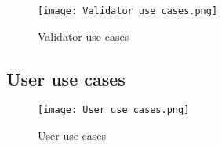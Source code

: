\begin{figure}[H]
    \texttt{[image: Validator use cases.png]}
    \centering
    \caption{Validator use cases}
    \label{fig:validator_use_cases}
\end{figure}

\subsection{User use cases}
\label{subsec:user_use_cases}

\begin{figure}[H]
    \texttt{[image: User use cases.png]}
    \centering
    \caption{User use cases}
    \label{fig:user_use_cases}
\end{figure}
